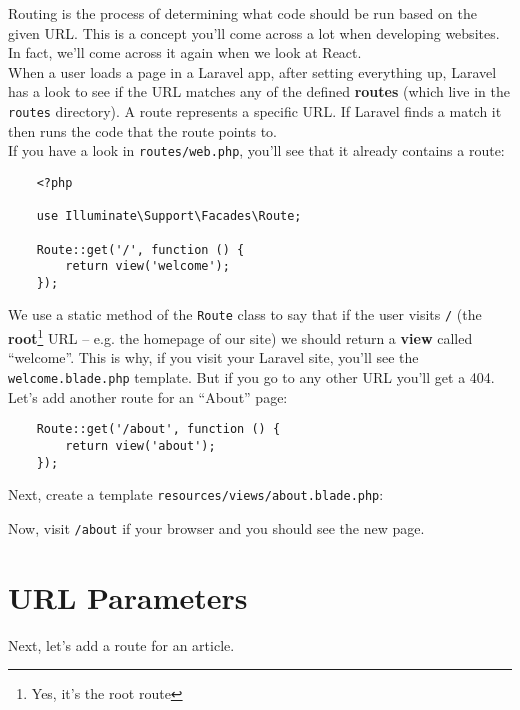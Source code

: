 Routing is the process of determining what code should be run based on the given URL. This is a concept you'll come across a lot when developing websites. In fact, we'll come across it again when we look at React.
\\

When a user loads a page in a Laravel app, after setting everything up, Laravel has a look to see if the URL matches any of the defined \textbf{routes} (which live in the \texttt{routes} directory). A route represents a specific URL. If Laravel finds a match it then runs the code that the route points to.
\\

If you have a look in \texttt{routes/web.php}, you'll see that it already contains a route:

\begin{verbatim}
    <?php

    use Illuminate\Support\Facades\Route;

    Route::get('/', function () {
        return view('welcome');
    });
\end{verbatim}

We use a static method of the \texttt{Route} class to say that if the user visits \texttt{/} (the \textbf{root}\footnote{Yes, it's the root route} URL – e.g. the homepage of our site) we should return a \textbf{view} called ``welcome''. This is why, if you visit your Laravel site, you'll see the \texttt{welcome.blade.php} template. But if you go to any other URL you'll get a 404.
\\

Let's add another route for an ``About'' page:

\begin{verbatim}
    Route::get('/about', function () {
        return view('about');
    });
\end{verbatim}

Next, create a template \texttt{resources/views/about.blade.php}:


Now, visit \texttt{/about} if your browser and you should see the new page.



\section{URL Parameters}

Next, let's add a route for an article.
\\

